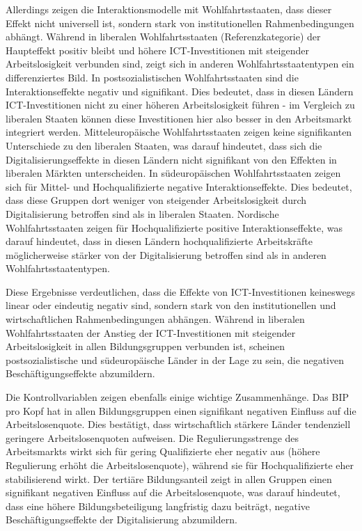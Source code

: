 Allerdings zeigen die Interaktionsmodelle mit Wohlfahrtsstaaten, dass dieser Effekt nicht 
universell ist, sondern stark von institutionellen Rahmenbedingungen abhängt. Während in 
liberalen Wohlfahrtsstaaten (Referenzkategorie) der Haupteffekt positiv bleibt und höhere 
\ac{ICT}-Investitionen mit steigender Arbeitslosigkeit verbunden sind, zeigt sich in anderen 
Wohlfahrtsstaatentypen ein differenziertes Bild. In postsozialistischen Wohlfahrtsstaaten 
sind die Interaktionseffekte negativ und signifikant. Dies bedeutet, dass in diesen Ländern 
\ac{ICT}-Investitionen nicht zu einer höheren Arbeitslosigkeit führen - im Vergleich zu 
liberalen Staaten können diese Investitionen hier also besser in den Arbeitsmarkt integriert 
werden. Mitteleuropäische Wohlfahrtsstaaten zeigen keine signifikanten Unterschiede zu den 
liberalen Staaten, was darauf hindeutet, dass sich die Digitalisierungseffekte in diesen Ländern 
nicht signifikant von den Effekten in liberalen Märkten unterscheiden. In südeuropäischen 
Wohlfahrtsstaaten zeigen sich für Mittel- und Hochqualifizierte negative Interaktionseffekte. 
Dies bedeutet, dass diese Gruppen dort weniger von steigender Arbeitslosigkeit durch Digitalisierung 
betroffen sind als in liberalen Staaten. Nordische Wohlfahrtsstaaten zeigen für Hochqualifizierte 
positive Interaktionseffekte, was darauf hindeutet, dass in diesen Ländern hochqualifizierte 
Arbeitskräfte möglicherweise stärker von der Digitalisierung betroffen sind als in anderen 
Wohlfahrtsstaatentypen.

Diese Ergebnisse verdeutlichen, dass die Effekte von \ac{ICT}-Investitionen keineswegs linear oder 
eindeutig negativ sind, sondern stark von den institutionellen und wirtschaftlichen Rahmenbedingungen 
abhängen. Während in liberalen Wohlfahrtsstaaten der Anstieg der \ac{ICT}-Investitionen mit steigender 
Arbeitslosigkeit in allen Bildungsgruppen verbunden ist, scheinen postsozialistische und südeuropäische 
Länder in der Lage zu sein, die negativen Beschäftigungseffekte abzumildern.

Die Kontrollvariablen zeigen ebenfalls einige wichtige Zusammenhänge. Das \ac{BIP} pro Kopf 
hat in allen Bildungsgruppen einen signifikant negativen Einfluss auf die Arbeitslosenquote. 
Dies bestätigt, dass wirtschaftlich stärkere Länder tendenziell geringere Arbeitslosenquoten 
aufweisen. Die Regulierungsstrenge des Arbeitsmarkts wirkt sich für gering Qualifizierte eher 
negativ aus (höhere Regulierung erhöht die Arbeitslosenquote), während sie für Hochqualifizierte 
eher stabilisierend wirkt. Der tertiäre Bildungsanteil zeigt in allen Gruppen einen signifikant 
negativen Einfluss auf die Arbeitslosenquote, was darauf hindeutet, dass eine höhere 
Bildungsbeteiligung langfristig dazu beiträgt, negative Beschäftigungseffekte der Digitalisierung 
abzumildern.

